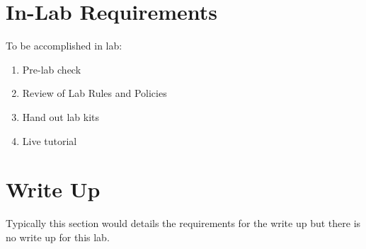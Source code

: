 \section{In-Lab Requirements}

To be accomplished in lab:

\begin{enumerate}
	\item Pre-lab check
	\item Review of Lab Rules and Policies
	\item Hand out lab kits
	\item Live tutorial
\end{enumerate}

\section{Write Up}

Typically this section would details the requirements for the write up but there is no write up for this lab. 


